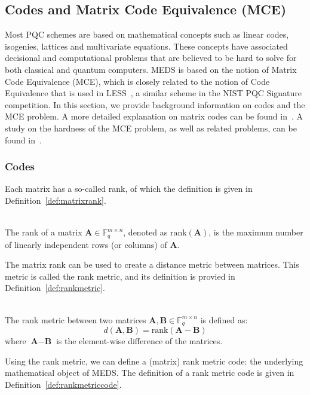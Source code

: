 \documentclass[11pt,a4paper]{report}
\theoremstyle{definition}
\begin{document}
\subsection{Codes and Matrix Code Equivalence (MCE)}
\label{sec:codes}
Most PQC schemes are based on mathematical concepts such as linear codes, isogenies, lattices and multivariate equations. These concepts have associated decisional and computational problems that are believed to be hard to solve for both classical and quantum computers. MEDS is based on the notion of Matrix Code Equivalence (MCE), which is closely related to the notion of Code Equivalence that is used in LESS~\cite{biasse2020less}, a similar scheme in the NIST PQC Signature competition. In this section, we provide background information on codes and the MCE problem. A more detailed explanation on matrix codes can be found in~\cite{gorla2021rank}. A study on the hardness of the MCE problem, as well as related problems, can be found in~\cite{reijnders2024hardness}.

\subsubsection{Codes}
Each matrix has a so-called rank, of which the definition is given in Definition~\ref{def:matrixrank}.

\begin{definition}~\\
  \label{def:matrixrank}
  The rank of a matrix $\textbf{A} \in \mathbb{F}_q^{m \times n}$, denoted as $\text{rank}(\textbf{A})$, is the maximum number of linearly independent rows (or columns) of $\textbf{A}$.
\end{definition}

The matrix rank can be used to create a distance metric between matrices. This metric is called the rank metric, and its definition is provied in Definition~\ref{def:rankmetric}.

\begin{definition}~\\
  \label{def:rankmetric}
  The rank metric between two matrices $\textbf{A}, \textbf{B} \in \mathbb{F}_q^{m \times n}$ is defined as:
  \[
    d(\textbf{A}, \textbf{B}) = \text{rank}(\textbf{A} - \textbf{B})
  \]
  where $\textbf{A} - \textbf{B}$ is the element-wise difference of the matrices.
\end{definition}

Using the rank metric, we can define a (matrix) rank metric code: the underlying mathematical object of MEDS. The definition of a rank metric code is given in Definition~\ref{def:rankmetriccode}.
\end{document}

